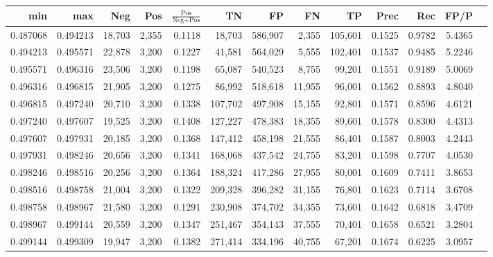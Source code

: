\begin{tabular}{rrrrrrrrrrrrr}
\toprule
     min &      max &    Neg &   Pos & $\frac{\text{Pos}}{\text{Neg}+\text{Pos}}$ &      TN &      FP &      FN &      TP &   Prec &    Rec &   FP/P \\
\midrule
0.487068 & 0.494213 & 18,703 & 2,355 &                                     0.1118 &  18,703 & 586,907 &   2,355 & 105,601 & 0.1525 & 0.9782 & 5.4365 \\
0.494213 & 0.495571 & 22,878 & 3,200 &                                     0.1227 &  41,581 & 564,029 &   5,555 & 102,401 & 0.1537 & 0.9485 & 5.2246 \\
0.495571 & 0.496316 & 23,506 & 3,200 &                                     0.1198 &  65,087 & 540,523 &   8,755 &  99,201 & 0.1551 & 0.9189 & 5.0069 \\
0.496316 & 0.496815 & 21,905 & 3,200 &                                     0.1275 &  86,992 & 518,618 &  11,955 &  96,001 & 0.1562 & 0.8893 & 4.8040 \\
0.496815 & 0.497240 & 20,710 & 3,200 &                                     0.1338 & 107,702 & 497,908 &  15,155 &  92,801 & 0.1571 & 0.8596 & 4.6121 \\
0.497240 & 0.497607 & 19,525 & 3,200 &                                     0.1408 & 127,227 & 478,383 &  18,355 &  89,601 & 0.1578 & 0.8300 & 4.4313 \\
0.497607 & 0.497931 & 20,185 & 3,200 &                                     0.1368 & 147,412 & 458,198 &  21,555 &  86,401 & 0.1587 & 0.8003 & 4.2443 \\
0.497931 & 0.498246 & 20,656 & 3,200 &                                     0.1341 & 168,068 & 437,542 &  24,755 &  83,201 & 0.1598 & 0.7707 & 4.0530 \\
0.498246 & 0.498516 & 20,256 & 3,200 &                                     0.1364 & 188,324 & 417,286 &  27,955 &  80,001 & 0.1609 & 0.7411 & 3.8653 \\
0.498516 & 0.498758 & 21,004 & 3,200 &                                     0.1322 & 209,328 & 396,282 &  31,155 &  76,801 & 0.1623 & 0.7114 & 3.6708 \\
0.498758 & 0.498967 & 21,580 & 3,200 &                                     0.1291 & 230,908 & 374,702 &  34,355 &  73,601 & 0.1642 & 0.6818 & 3.4709 \\
0.498967 & 0.499144 & 20,559 & 3,200 &                                     0.1347 & 251,467 & 354,143 &  37,555 &  70,401 & 0.1658 & 0.6521 & 3.2804 \\
0.499144 & 0.499309 & 19,947 & 3,200 &                                     0.1382 & 271,414 & 334,196 &  40,755 &  67,201 & 0.1674 & 0.6225 & 3.0957 \\

\end{tabular}
